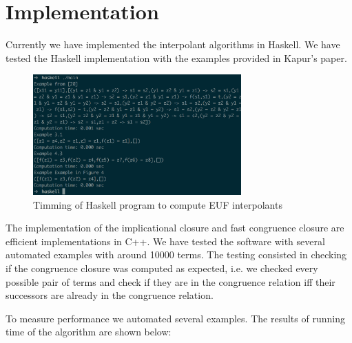 \section{Implementation}

Currently we have implemented the interpolant algorithms in Haskell. We have tested
the Haskell implementation with the examples provided in Kapur's paper.

\begin{figure}[h]
  \centering
  \includegraphics[width=8cm]{eufPerformance}
  \caption{Timming of Haskell program to compute EUF interpolants}
\end{figure}

The implementation of the implicational closure and fast congruence closure
are efficient implementations in C++. We have tested the software with
several automated examples with around 10000 terms. The testing consisted
in checking if the congruence closure was computed as expected, i.e. we checked
every possible pair of terms and check if they are in the congruence
relation iff their successors are already in the congruence relation.

To measure performance we automated several examples. The results of running
time of the algorithm are shown below:

